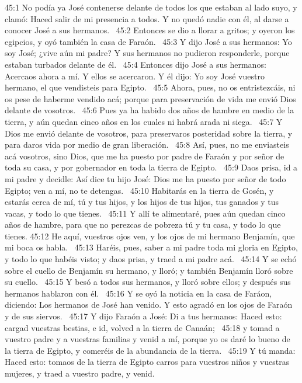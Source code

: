 45:1 No podía ya José contenerse delante de todos los que estaban al lado suyo, y clamó: Haced salir de mi presencia a todos. Y no quedó nadie con él, al darse a conocer José a sus hermanos.  
45:2 Entonces se dio a llorar a gritos; y oyeron los egipcios, y oyó también la casa de Faraón.  
45:3 Y dijo José a sus hermanos: Yo soy José; ¿vive aún mi padre? Y sus hermanos no pudieron responderle, porque estaban turbados delante de él.  
45:4 Entonces dijo José a sus hermanos: Acercaos ahora a mí. Y ellos se acercaron. Y él dijo: Yo soy José vuestro hermano, el que vendisteis para Egipto.  
45:5 Ahora, pues, no os entristezcáis, ni os pese de haberme vendido acá; porque para preservación de vida me envió Dios delante de vosotros.  
45:6 Pues ya ha habido dos años de hambre en medio de la tierra, y aún quedan cinco años en los cuales ni habrá arada ni siega.  
45:7 Y Dios me envió delante de vosotros, para preservaros posteridad sobre la tierra, y para daros vida por medio de gran liberación.  
45:8 Así, pues, no me enviasteis acá vosotros, sino Dios, que me ha puesto por padre de Faraón y por señor de toda su casa, y por gobernador en toda la tierra de Egipto.  
45:9 Daos prisa, id a mi padre y decidle: Así dice tu hijo José: Dios me ha puesto por señor de todo Egipto; ven a mí, no te detengas.  
45:10 Habitarás en la tierra de Gosén, y estarás cerca de mí, tú y tus hijos, y los hijos de tus hijos, tus ganados y tus vacas, y todo lo que tienes.  
45:11 Y allí te alimentaré, pues aún quedan cinco años de hambre, para que no perezcas de pobreza tú y tu casa, y todo lo que tienes. 
45:12 He aquí, vuestros ojos ven, y los ojos de mi hermano Benjamín, que mi boca os habla.  
45:13 Haréis, pues, saber a mi padre toda mi gloria en Egipto, y todo lo que habéis visto; y daos prisa, y traed a mi padre acá.  
45:14 Y se echó sobre el cuello de Benjamín su hermano, y lloró; y también Benjamín lloró sobre su cuello.  
45:15 Y besó a todos sus hermanos, y lloró sobre ellos; y después sus hermanos hablaron con él.  
45:16 Y se oyó la noticia en la casa de Faráon, diciendo: Los hermanos de José han venido. Y esto agradó en los ojos de Faraón y de sus siervos.  
45:17 Y dijo Faraón a José: Di a tus hermanos: Haced esto: cargad vuestras bestias, e id, volved a la tierra de Canaán;  
45:18 y tomad a vuestro padre y a vuestras familias y venid a mí, porque yo os daré lo bueno de la tierra de Egipto, y comeréis de la abundancia de la tierra.  
45:19 Y tú manda: Haced esto: tomaos de la tierra de Egipto carros para vuestros niños y vuestras mujeres, y traed a vuestro padre, y venid.  
